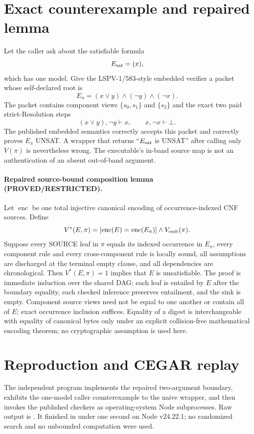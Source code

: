 \documentclass[11pt]{article}
\begin{document}
\section{Exact counterexample and repaired lemma}
Let the caller ask about the satisfiable formula
\[
 E_{\rm sat}=(x),
\]
which has one model.  Give the LSPV-1/583-style embedded verifier a packet
whose self-declared root is
\[
 E_\pi=(x\lor y)\wedge(\neg y)\wedge(\neg x).
\]
The packet contains component views $\{s_0,s_1\}$ and $\{s_2\}$ and the exact
two paid strict-Resolution steps
\[
 (x\lor y),\neg y\vdash x,
 \qquad x,\neg x\vdash\bot.
\]
The published embedded semantics correctly accepts this packet and correctly
proves $E_\pi$ UNSAT.  A wrapper that returns ``$E_{\rm sat}$ is UNSAT'' after
calling only $V(\pi)$ is nevertheless wrong.  The executable's in-band source
map is not an authentication of an absent out-of-band argument.

\paragraph{Repaired source-bound composition lemma (PROVED/RESTRICTED).}
Let $\operatorname{enc}$ be one total injective canonical encoding of
occurrence-indexed CNF sources.  Define
\[
 V^*(E,\pi)=
 [\operatorname{enc}(E)=\operatorname{enc}(E_\pi)]\wedge V_{\rm emb}(\pi).
\]
Suppose every SOURCE leaf in $\pi$ equals its indexed occurrence in $E_\pi$,
every component rule and every cross-component rule is locally sound, all
assumptions are discharged at the terminal empty clause, and all dependencies
are chronological.  Then $V^*(E,\pi)=1$ implies that $E$ is unsatisfiable.
The proof is immediate induction over the shared DAG: each leaf is entailed by
$E$ after the boundary equality, each checked inference preserves entailment,
and the sink is empty.  Component source views need not be equal to one
another or contain all of $E$; exact occurrence inclusion suffices.  Equality
of a digest is interchangeable with equality of canonical bytes only under an
explicit collision-free mathematical encoding theorem; no cryptographic
assumption is used here.

\section{Reproduction and CEGAR replay}
The independent program
implements the repaired two-argument boundary, exhibits the one-model caller
counterexample to the naive wrapper, and then invokes the published checkers
as operating-system Node subprocesses.  Raw output is
.
It finished in under one second on Node v24.22.1; no randomized search and no
unbounded computation were used.
\end{document}
